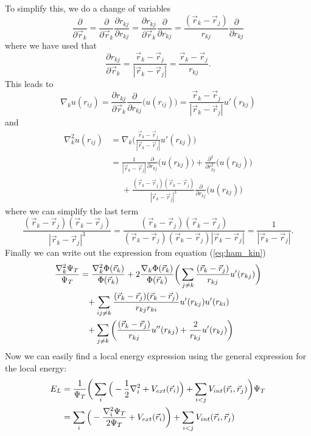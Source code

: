 \documentclass[norsk,a4paper,12pt]{article}
\begin{document}
To simplify this, we do a change of variables
\begin{equation}
\frac{\partial}{\partial \vec{r}_k}=\frac{\partial}{\partial \vec{r}_k}\frac{\partial r_{kj}}{\partial r_{kj}}=\frac{\partial r_{kj}}{\partial \vec{r}_k}\frac{\partial}{\partial r_{kj}}=\frac{(\vec{r}_k-\vec{r}_j)}{r_{kj}}\frac{\partial}{\partial r_{kj}}
\end{equation}
where we have used that
\begin{equation}
\frac{\partial r_{kj}}{\partial \vec{r}_k}=\frac{\vec{r}_k - \vec{r}_j}{|\vec{r}_k - \vec{r}_j|}=\frac{\vec{r}_k - \vec{r}_j}{r_{kj}}.
\end{equation}
This leads to
\begin{equation}
\nabla_ku(r_{ij})=\frac{\partial r_{kj}}{\partial \vec{r}_k}\frac{\partial}{\partial r_{kj}}\big(u(r_{ij})\big)=\frac{\vec{r}_k - \vec{r}_j}{|\vec{r}_k - \vec{r}_j|}u'(r_{kj})
\end{equation}
and
\begin{align*}
\nabla_k^2u(r_{ij})&=\nabla_k\bigg(\frac{\vec{r}_k - \vec{r}_j}{|\vec{r}_k - \vec{r}_j|}u'(r_{kj})\bigg)\\
&=\frac{1}{|\vec{r}_k-\vec{r}_j|}\frac{\partial}{\partial r_{kj}}\big(u(r_{kj})\big)+\frac{\partial^2}{\partial r_{kj}^2}\big(u(r_{kj})\big)\\
&\phantom{=}+\frac{(\vec{r}_k-\vec{r}_j)(\vec{r}_k-\vec{r}_j)}{|\vec{r}_k-\vec{r}_j|^3}\frac{\partial}{\partial r_{kj}}\big(u(r_{kj})\big)
\end{align*}
where we can simplify the last term
\begin{equation}
\frac{(\vec{r}_k-\vec{r}_j)(\vec{r}_k-\vec{r}_j)}{|\vec{r}_k-\vec{r}_j|^3}=\frac{(\vec{r}_k - \vec{r}_j)(\vec{r}_k - \vec{r}_j)}{(\vec{r}_k - \vec{r}_j)(\vec{r}_k - \vec{r}_j)|\vec{r}_k - \vec{r}_j|}=\frac{1}{|\vec{r}_k - \vec{r}_j|}.
\end{equation}
Finally we can write out the expression from equation (\ref{eq:ham_kin}) 
\begin{align}
\frac{\nabla_k^2\Psi_T}{\Psi_T}&=\frac{\nabla_k^2\Phi(\vec{r}_k)}{\Phi(\vec{r}_k)} + 2\frac{\nabla_k\Phi(\vec{r}_k)}{\Phi(\vec{r}_k)}\bigg(\sum_{j\neq k}\frac{(\vec{r}_k-\vec{r}_j)}{r_{kj}}u'(r_{kj})\bigg)\notag\\
&\phantom{=}+\sum_{ij\neq k}\frac{(\vec{r}_k-\vec{r}_j)(\vec{r}_k-\vec{r}_j)}{r_{kj}r_{ki}}u'(r_{kj})u'(r_{ki})\\
&\phantom{=}+\sum_{j\neq k}\bigg(\frac{(\vec{r}_k-\vec{r}_j)}{r_{kj}}u''(r_{kj})+\frac{2}{r_{kj}}u'(r_{kj})\bigg)\notag
\end{align}
Now we can easily find a local energy expression using the general expression for the local energy:
\begin{align}
E_L&=\frac{1}{\Psi_T}\bigg(\sum_i\Big(-\frac{1}{2}\nabla_i^2+V_{ext}(\vec{r}_i)\Big) + \sum_{i<j}V_{int}(\vec{r}_i,\vec{r}_j)\bigg)\Psi_T\notag\\
&=\sum_i\Big(-\frac{\nabla_i^2\Psi_T}{2\Psi_T}+V_{ext}(\vec{r}_i)\bigg)+\sum_{i<j}V_{int}(\vec{r}_i,\vec{r}_j)
\end{align}
\end{document}
